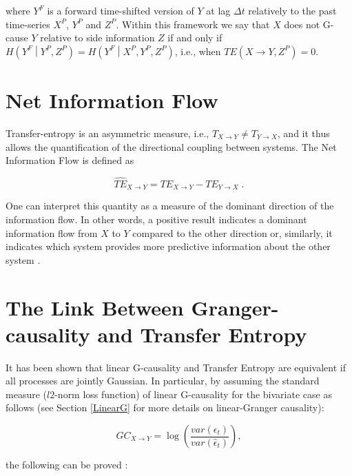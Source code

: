 \documentclass[]{book}
\theoremstyle{definition}
\theoremstyle{definition}
\theoremstyle{definition}
\theoremstyle{remark}
\begin{document}
where \(Y^F\) is a forward time-shifted version of \(Y\) at lag
\(\Delta t\) relatively to the past time-series \(X^P\), \(Y^P\) and
\(Z^P\). Within this framework we say that \(X\) does not G-cause \(Y\)
relative to side information \(Z\) if and only if
\(H\left(Y^F\middle\vert Y^P,Z^P \right) = H\left(Y^F\middle\vert X^P, Y^P,Z^P\right)\),
i.e., when \(TE\left(X \rightarrow Y,Z^P\right) = 0\).

\section{Net Information Flow}\label{net-information-flow}

Transfer-entropy is an asymmetric measure, i.e.,
\(T_{X \rightarrow Y} \neq T_{Y \rightarrow X}\), and it thus allows the
quantification of the directional coupling between systems. The Net
Information Flow is defined as

\begin{equation}
\widehat{TE}_{X \rightarrow Y} = TE_{X \rightarrow Y} - TE_{Y \rightarrow X}\;.
\end{equation}

One can interpret this quantity as a measure of the dominant direction
of the information flow. In other words, a positive result indicates a
dominant information flow from \(X\) to \(Y\) compared to the other
direction or, similarly, it indicates which system provides more
predictive information about the other system
\citep{Michalowicz:2013:HDE:2601840}.

\section{The Link Between Granger-causality and Transfer
Entropy}\label{the-link-between-granger-causality-and-transfer-entropy}

It has been shown \citep{PhysRevLett.103.238701} that linear G-causality
and Transfer Entropy are equivalent if all processes are jointly
Gaussian. In particular, by assuming the standard measure (\(l2\)-norm
loss function) of linear G-causality for the bivariate case as follows
(see Section \ref{LinearG} for more details on linear-Granger
causality):

\begin{equation}
GC_{X \rightarrow Y} = \log\left( \frac{var(\epsilon_t)}{var( \widehat{\epsilon}_t)} \right),
\label{eq:GCGC}
\end{equation}

the following can be proved \citep{PhysRevLett.103.238701}:
\end{document}
